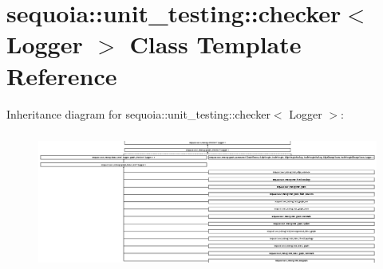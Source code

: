 \hypertarget{classsequoia_1_1unit__testing_1_1checker}{}\section{sequoia\+::unit\+\_\+testing\+::checker$<$ Logger $>$ Class Template Reference}
\label{classsequoia_1_1unit__testing_1_1checker}
Inheritance diagram for sequoia\+::unit\+\_\+testing\+::checker$<$ Logger $>$\+:\begin{figure}[H]
\begin{center}
\leavevmode
\includegraphics[height=4.559387cm]{classsequoia_1_1unit__testing_1_1checker}
\end{center}
\end{figure}

